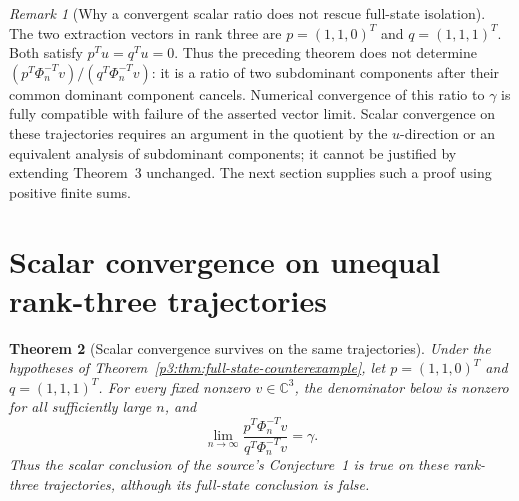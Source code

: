\documentclass[11pt,a4paper]{article}
\newtheorem{theorem}{Theorem}[section]
\theoremstyle{definition}
\theoremstyle{remark}
\newtheorem{remark}[theorem]{Remark}
\numberwithin{equation}{section}
\begin{document}
\begin{remark}[Why a convergent scalar ratio does not rescue full-state isolation]
The two extraction vectors in rank three are
$p=(1,1,0)^T$ and $q=(1,1,1)^T$. Both satisfy $p^Tu=q^Tu=0$.
Thus the preceding theorem does not determine
$(p^T\Phi_n^{-T}v)/(q^T\Phi_n^{-T}v)$: it is a ratio of two
subdominant components after their common dominant component cancels.
Numerical convergence of this ratio to $\gamma$ is fully compatible
with failure of the asserted vector limit. Scalar convergence on these trajectories requires an argument in the
quotient by the $u$-direction or an equivalent analysis of subdominant
components; it cannot be justified by extending Theorem~3 unchanged.
The next section supplies such a proof using positive finite sums.
\end{remark}



\section{Scalar convergence on unequal rank-three trajectories}
\label{p3:sec:cmf-scalar}

\begin{theorem}[Scalar convergence survives on the same trajectories]
\label{p3:thm:unequal-rank-three-scalar}
Under the hypotheses of Theorem~\ref{p3:thm:full-state-counterexample}, let
$p=(1,1,0)^T$ and $q=(1,1,1)^T$. For every fixed nonzero
$v\in\mathbb C^3$, the denominator below is nonzero for all sufficiently
large $n$, and
\[
 \lim_{n\to\infty}\frac{p^T\Phi_n^{-T}v}{q^T\Phi_n^{-T}v}=\gamma.
\]
Thus the scalar conclusion of the source's Conjecture~1 is true on
these rank-three trajectories, although its full-state conclusion is false.
\end{theorem}
\end{document}
